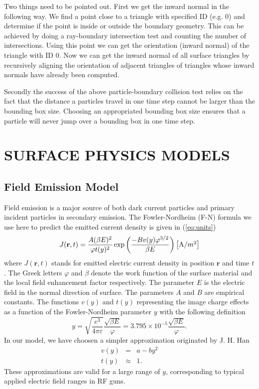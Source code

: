 \documentclass{JAC2003}
\begin{document}
Two things need to be pointed out. First we get the inward normal in the
following way. We find a point close to a triangle with specified ID (e.g. 0)
and determine if the point is inside or outside the boundary geometry. This can
be achieved by doing a ray-boundary intersection test and counting the number of
intersections. Using this point we can get the orientation (inward normal) of
the triangle with ID 0. Now we can get the inward normal of all
surface triangles by recursively aligning the orientation of adjacent triangles
of triangles whose inward normals have already been computed.

Secondly the success of the above particle-boundary collision test relies on the
fact that the distance a particles travel in one time step cannot be larger than
the bounding box size. Choosing an appropriated bounding box size ensures that a
particle will never jump over a bounding box in one time step.

\section{SURFACE PHYSICS MODELS}

\subsection{Field Emission Model}

Field emission is a major source of both dark current particles and primary
incident particles in secondary emission. The Fowler-Nordheim (F-N) formula
we use here to predict the emitted current density is given in (\ref{eq:units})
\cite{BC} \cite{FN}
%
\begin{equation}\label{eq:units}
    J(\mathbf{r},t) = \frac{A(\beta E)^2}{\varphi t(y)^2}
                      \exp{\left(\frac{-B v(y)\varphi^{3/2}}{\beta E}\right)}
                      \left[\hbox{A/$m^2$}\right]
\end{equation}
%
where $J(\mathbf{r},t)$ stands for emitted electric current density in position
$\mathbf{r}$ and time $t$. The Greek letters $\varphi$ and $\beta$ denote the
work function of the surface material and the local field enhancement factor
respectively. The parameter $E$ is the electric field in the normal direction
of surface. The parameters $A$ and $B$ are empirical constants. The functions
$v(y)$ and $t(y)$ representing the image charge effects \cite{BC} as a function
of the Fowler-Nordheim parameter $y$ with the following definition\cite{DE}
%
\begin{equation}\label{eq:imagecharge}
    y = \sqrt{\frac{e^3}{4\pi\varepsilon}}\frac{\sqrt{\beta E}}{\varphi} 
      = 3.795\times10^{-5}\frac{\sqrt{\beta E}}{\varphi} \text{.}
\end{equation}
%
In our model, we have choosen a simpler approximation originated by J. H. Han\cite{DE}
\begin{eqnarray*}
v(y) &=& a-by^2 \\
t(y) &\approx& 1 \text{.}
\end{eqnarray*}
These approximations are valid for a large range of $y$, corresponding to
typical applied electric field ranges in RF guns.
\end{document}
